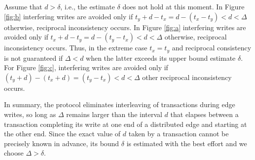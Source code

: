 Assume that $d > \delta$, i.e., the estimate $\delta$ does not hold at this moment.
In Figure \ref{fig:b} interfering writes are avoided only if $t_y + d - t_x = d - (t_x-t_y) < d < \Delta$ otherwise, reciprocal inconsistency occurs.
In Figure \ref{fig:a} interfering writes are avoided only if $t_x + d - t_y = d - (t_y-t_x) < d < \Delta$ otherwise, reciprocal inconsistency occurs.
Thus, in the extreme case $t_x = t_y$ and reciprocal consistency is not guaranteed if $\Delta < d$ when the latter exceeds its upper bound estimate $\delta$.
For Figure \ref{fig:c}, interfering writes are avoided only if $(t_y + d) - (t_x + d) = (t_y- t_x) < d < \Delta$ other reciprocal inconsistency occurs.




In summary, the \tDelta protocol eliminates interleaving of transactions during edge writes, so long as $\Delta$ remains larger than the interval $d$ that elapses between a transaction completing its write at one end of a distributed edge and starting at the other end.
Since the exact value of $d$ taken by a transaction cannot be precisely known in advance, its bound $\delta$ is estimated with the best effort and we choose $\Delta > \delta$.

